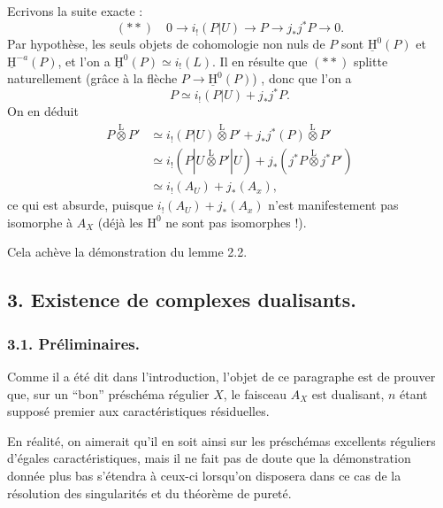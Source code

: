 \documentclass[11pt]{article}
\providecommand{\uH}{\underline{\mathrm H}}
\renewcommand{\H}{\mathrm{H}}
\begin{document}
Ecrivons la suite exacte :
\[
(**) \quad 0 \longrightarrow i_{!}(P|U) \longrightarrow P \longrightarrow j_{*}j^{*}P \longrightarrow 0.
\]
Par hypothèse, les seuls objets de cohomologie non nuls de $P$ sont $\uH^{0}(P)$ et $\uH^{-a}(P)$, et l'on a $\uH^{0}(P) \simeq i_{!}(L)$. Il en résulte que $(**)$ splitte naturellement (grâce à la flèche $P \to \uH^{0}(P)$)%
, donc que l'on a
\[
P \simeq i_{!}(P|U) + j_{*}j^{*}P.
\]
On en déduit
\begin{align*}
P \mathop{\otimes}\limits^{\mathrm{L}} P' &\simeq i_{!}(P|U) \mathop{\otimes}\limits^{\mathrm{L}} P' + j_{*}j^{*}(P) \mathop{\otimes}\limits^{\mathrm{L}} P' \\
&\simeq i_{!}(P|U \mathop{\otimes}\limits^{\mathrm{L}} P'|U) + j_{*}(j^{*}P \mathop{\otimes}\limits^{\mathrm{L}} j^{*}P') \\
&\simeq i_{!}(A_U) + j_{*}(A_x),
\end{align*}
ce qui est absurde, puisque $i_{!}(A_U) + j_{*}(A_x)$ n'est manifestement pas isomorphe à $A_X$ (déjà les $\H^{0}$ ne sont pas isomorphes !).

Cela achève la démonstration du lemme 2.2.

\subsection*{3. Existence de complexes dualisants.}

\subsubsection*{3.1. Préliminaires.}

Comme il a été dit dans l'introduction, l'objet de ce paragraphe est de prouver que, sur un ``bon'' préschéma régulier $X$, le faisceau $A_X$ est dualisant, $n$ étant supposé premier aux caractéristiques résiduelles.

En réalité, on aimerait qu'il en soit ainsi sur les préschémas excellents réguliers d'égales caractéristiques, mais il ne fait pas de doute que la démonstration donnée plus bas s'étendra à ceux-ci lorsqu'on disposera dans ce cas de la résolution des singularités et du théorème de pureté.
\end{document}
